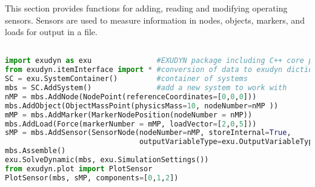 \label{sec:mainsystem:sensor}



This section provides functions for adding, reading and modifying operating sensors. Sensors are used to measure information in nodes, objects, markers, and loads for output in a file.
\pythonstyle
\begin{lstlisting}[language=Python, firstnumber=1]

import exudyn as exu               #EXUDYN package including C++ core part
from exudyn.itemInterface import * #conversion of data to exudyn dictionaries
SC = exu.SystemContainer()         #container of systems
mbs = SC.AddSystem()               #add a new system to work with
nMP = mbs.AddNode(NodePoint(referenceCoordinates=[0,0,0]))
mbs.AddObject(ObjectMassPoint(physicsMass=10, nodeNumber=nMP ))
mMP = mbs.AddMarker(MarkerNodePosition(nodeNumber = nMP))
mbs.AddLoad(Force(markerNumber = mMP, loadVector=[2,0,5]))
sMP = mbs.AddSensor(SensorNode(nodeNumber=nMP, storeInternal=True,
                               outputVariableType=exu.OutputVariableType.Position))
mbs.Assemble()
exu.SolveDynamic(mbs, exu.SimulationSettings())
from exudyn.plot import PlotSensor
PlotSensor(mbs, sMP, components=[0,1,2])
\end{lstlisting}

